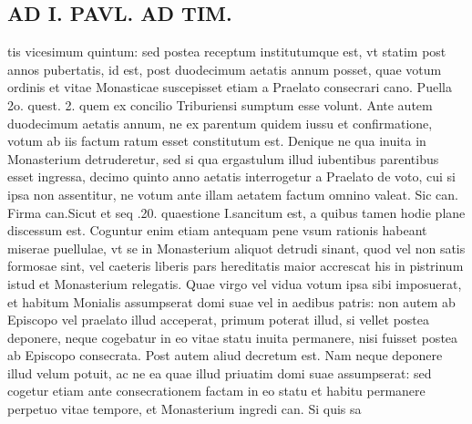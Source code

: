 \documentclass{article}
\begin{document}
\begin{pages}
\section*{AD I. PAVL. AD TIM. }
\marginpar{[ p.294 ]}\pstart tis vicesimum quintum: sed postea receptum institutumque est, vt statim post annos pubertatis, id est, post duodecimum aetatis annum posset, quae votum ordinis et vitae Monasticae suscepisset etiam a Praelato consecrari cano. Puella 2o. quest. 2. quem ex concilio Triburiensi sumptum esse volunt. Ante autem duodecimum aetatis annum, ne ex parentum quidem iussu et confirmatione, votum ab iis factum ratum esset constitutum est. Denique ne qua inuita in Monasterium detruderetur, sed si qua ergastulum illud iubentibus parentibus esset ingressa, decimo quinto anno aetatis interrogetur a Praelato de voto, cui si ipsa non assentitur, ne votum ante illam aetatem factum omnino valeat. Sic can. Firma can.Sicut et seq .20. quaestione I.sancitum est, a quibus tamen hodie plane discessum est. Coguntur enim etiam antequam pene vsum rationis habeant miserae puellulae, vt se in Monasterium aliquot detrudi sinant, quod vel non satis formosae sint, vel caeteris liberis pars hereditatis maior accrescat his in pistrinum istud et Monasterium relegatis. Quae virgo vel vidua votum ipsa sibi imposuerat, et habitum Monialis assumpserat domi suae vel in aedibus patris: non autem ab Episcopo vel praelato illud acceperat, primum poterat illud, si vellet postea deponere, neque cogebatur in eo vitae statu inuita permanere, nisi fuisset postea ab Episcopo consecrata. Post autem aliud decretum est. Nam neque deponere illud velum potuit, ac ne ea quae illud priuatim domi suae assumpserat: sed cogetur etiam ante consecrationem factam in eo statu et habitu permanere perpetuo vitae tempore, et Monasterium ingredi can. Si quis sa\pend

\end{pages}
\end{document}
